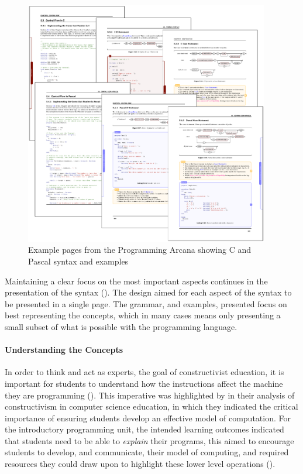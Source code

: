 \begin{figure}[h]
  \centering
  \includegraphics[width=0.95\textwidth]{ArcanaSyntax}
  \caption{Example pages from the Programming Arcana showing C and Pascal syntax and examples}
  \label{fig:arcana_syntax}
\end{figure}

Maintaining a clear focus on the most important aspects continues in the presentation of the syntax (). The design aimed for each aspect of the syntax to be presented in a single page. The grammar, and examples, presented focus on best representing the concepts, which in many cases means only presenting a small subset of what is possible with the programming language. 


\paragraph{Understanding the Concepts} %
\label{par:understanding_the_concepts_}

In order to think and act as experts, the goal of constructivist education, it is important for students to understand how the instructions affect the machine they are programming (). This imperative was highlighted by \citet{BenAri:1998,BenAri:2001} in their analysis of constructivism in computer science education, in which they indicated the critical importance of ensuring students develop an effective model of computation. For the introductory programming unit, the intended learning outcomes indicated that students need to be able to \emph{explain} their programs, this aimed to encourage students to develop, and communicate, their model of computing, and required resources they could draw upon to highlight these lower level operations ().

